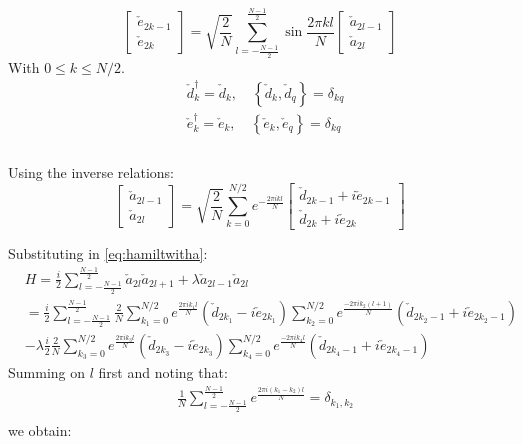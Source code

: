 \documentclass[10pt,a4paper]{article}
\begin{document}
	\begin{equation}\label{eq:edefinition}\left[\begin{array}{c}
	\check{e}_{2 k-1} \\
	\check{e}_{2 k}
	\end{array}\right]=\sqrt{\frac{2}{N}} \sum_{l=-\frac{N-1}{2}}^{\frac{N-1}{2}} \sin \frac{2 \pi k l}{N}\left[\begin{array}{c}
	\check{a}_{2 l-1} \\
	\check{a}_{2 l}
	\end{array}\right]\end{equation}	
	With $0\le k \le N/2$. \\
	\begin{equation}\begin{aligned}
	&\check{d}_{k}^{\dagger}=\check{d}_{k}, \quad\left\{\check{d}_{k}, \check{d}_{q}\right\}=\delta_{k q}\\
	&\check{e}_{k}^{\dagger}=\check{e}_{k}, \quad\left\{\check{e}_{k}, \check{e}_{q}\right\}=\delta_{k q}\\
	\end{aligned}	
	\end{equation} \\ 
	Using the inverse relations:
	\begin{equation}\left[\begin{array}{c}
	\check{a}_{2 l-1} \\
	\check{a}_{2 l}
	\end{array}\right]=\sqrt{\frac{2}{N}} \sum_{k=0}^{N/2} e^{-\frac{2 \pi i k l}{N}}\left[\begin{array}{c}
	\check{d}_{2 k-1}+i\check{e}_{2 k-1} \\
	\check{d}_{2 k}+i\check{e}_{2 k}
	\end{array}\right]
	\end{equation}


Substituting in \ref{eq:hamiltwitha}:
\begin{equation}\begin{aligned}
&H =\frac{i}{2} \sum_{l=-\frac{N-1}{2}}^{\frac{N-1}{2}} \check{a}_{2 l} \check{a}_{2 l+1}  
+ \lambda \check{a}_{2 l-1} \check{a}_{2 l} \\
&=\frac{i}{2}\sum_{l=-\frac{N-1}{2}}^{\frac{N-1}{2}} \frac{2}{N}\sum_{k_1=0}^{N/2} e^{\frac{2 \pi i k_1 l}{N}}   \left(\check{d}_{2 k_1}-i\check{e}_{2 k_1}\right) \sum_{k_2=0}^{N/2} e^{\frac{-2 \pi i k_2 (l+1)}{N}}  \left(\check{d}_{2 k_2-1}+i\check{e}_{2 k_2-1}  \right)  \\
&-\lambda\frac{i}{2} \frac{2}{N}\sum_{k_3=0}^{N/2} e^{\frac{2 \pi i k_3 l}{N}}   \left(\check{d}_{2 k_3}-i\check{e}_{2 k_3}\right) \sum_{k_4=0}^{N/2} e^{\frac{-2 \pi i k_4 l}{N}}  \left(\check{d}_{2 k_4-1}+i\check{e}_{2 k_4-1}  \right)\end{aligned}
\end{equation}	
Summing on $l$ first and noting that:
\begin{equation}\label{eq:delta}\begin{aligned}
&\frac{1}{N}\sum_{l=-\frac{N-1}{2}}^{\frac{N-1}{2}}e^{\frac{2 \pi i (k_1-k_2) l}{N}} = \delta_{k_1,k_2}\\
\end{aligned}
\end{equation}
we obtain:
\end{document}
